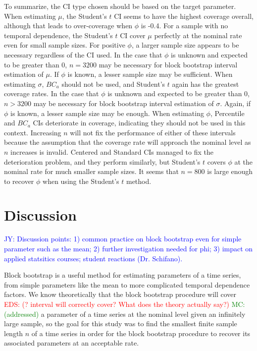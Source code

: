 \documentclass[12pt, letterpaper, titlepage]{article}
\newcommand{\jy}[1]{\textcolor{blue}{JY: #1}}
\newcommand{\eds}[1]{\textcolor{red}{EDS: (#1)}}
\newcommand{\mc}[1]{\textcolor{green}{MC: (#1)}}
\begin{document}
To summarize, the CI type chosen should be based on the target parameter. 
When estimating $\mu$, the Student's $t$ CI seems to have the highest coverage
overall, although that leads to over-coverage when $\phi$ is -0.4. For a
sample with no temporal dependence, the Student's $t$ CI cover $\mu$ perfectly
at the nominal rate even for small sample sizes. For positive $\phi$, a larger
sample size appears to be necessary regardless of the CI used. In the case
that $\phi$ is unknown and expected to be greater than $0$, $n = 3200$ may be
necessary for block bootstrap interval estimation of $\mu$. If $\phi$ is known,
a lesser sample size may be sufficient. When estimating $\sigma$,
$BC_a$ should not be used, and Student's $t$ again has the greatest coverage
rates. In the case that $\phi$ is unknown and expected to be greater than $0$,
$n > 3200$ may be necessary for block bootstrap interval estimation of
$\sigma$. Again, if $\phi$ is known, a lesser sample size may be enough.
When estimating $\phi$, Percentile and $BC_a$ CIs 
deteriorate in coverage, indicating they should not be used in this context. 
Increasing $n$ will not fix the performance of either of these intervals 
because the assumption that the coverage rate will approach the nominal level
as $n$ increases is invalid. Centered and Standard CIs managed to fix the
deterioration problem, and they perform similarly, but Student's $t$ covers
$\phi$ at the nominal rate for much smaller sample sizes. It seems that 
$n = 800$ is large enough to
recover $\phi$ when using the Student's $t$ method.



\section{Discussion}
\label{sec:disc}

\jy{Discussion points:
  1) common practice on block bootstrap even for simple parameter such as the
  mean;
  2) further investigation needed for phi;
  3) impact on applied statsitics courses; student reactions (Dr. Schifano).
}


Block bootstrap is a useful method for estimating parameters of a time
series, from simple parameters like the mean to more complicated temporal
 dependence factors.
 We know theoretically that the block bootstrap procedure will cover
 \eds{? interval will correctly cover?  What does the theory  actually say?}
 \mc{addressed} a
 parameter of a time series at the nominal level given an
 infinitely large
sample, so the goal for this study was to find the smallest finite
sample length $n$ of a time series in order for the block bootstrap procedure
to 
recover its associated parameters at an acceptable rate.
\end{document}
